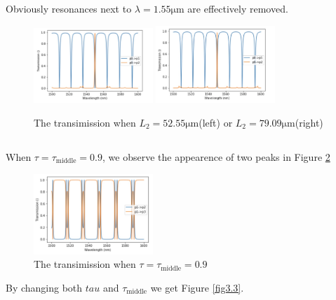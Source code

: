 \documentclass[fontsize=11pt]{scrartcl}
\begin{document}
Obviously resonances next to $\lambda=1.55\mathrm{\mu m}$ are effectively
removed.
\begin{figure}[H]
    \centering
    \includegraphics[width=0.4\textwidth]{img/fig3.1a.png}
    \hspace{0.5cm}
    \includegraphics[width=0.4\textwidth]{img/fig3.1b.png}
    \caption{The transimission when $L_2=52.55 \mathrm{\mu m}$(left) 
    or $L_2=79.09 \mathrm{\mu m}$(right)}
    \label{fig3.1}
\end{figure}

\subsection{}
When $\tau = \tau_{\mathrm{middle}}=0.9$, we observe the appearence of 
two peaks in Figure \ref{fig3.2}
\begin{figure}[H]
    \centering
    \includegraphics[width=0.4\textwidth]{img/fig3.2.png}
    \caption{The transimission when $\tau = \tau_{\mathrm{middle}}=0.9$}
    \label{fig3.2}
\end{figure}

By changing both $tau$ and $\tau_{\mathrm{middle}}$ we get Figure \ref{fig3.3}.
\end{document}
